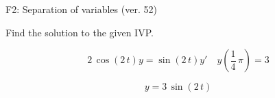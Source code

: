 \begin{exercise}
  \begin{exerciseTitle}F2: Separation of variables (ver. 52)\end{exerciseTitle}
  \begin{exerciseStatement}
    
Find the solution to the given IVP.

    
\[2 \, \cos\left(2 \, t\right) y= \sin\left(2 \, t\right) y'\hspace{1em} y\left( \frac{1}{4} \, \pi \right)= 3\]

  \end{exerciseStatement}
  \begin{exerciseAnswer}
    
\[y= 3 \, \sin\left(2 \, t\right)\]

  \end{exerciseAnswer}
\end{exercise}